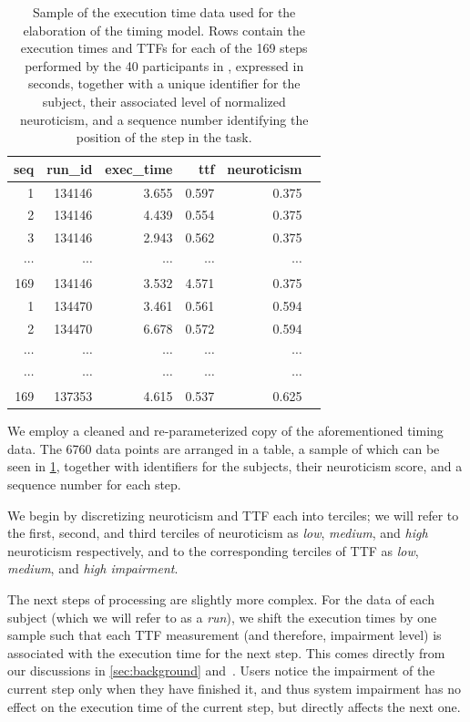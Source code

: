 \begin{table}
\centering
\caption[A]{%
    Sample of the execution time data  used for the elaboration of the timing model.
    Rows contain the execution times and \acp{TTF} for each of the \num{169} steps performed by the \num{40} participants in \textcite{olguinmunoz:impact2021}, expressed in seconds, together with a unique identifier for the subject, their associated level of normalized neuroticism, and a sequence number identifying the position of the step in the task.
}\label{tab:data:exectime}
\begin{tabular}{rrrrrr}
    \toprule
    {seq} & {run\_id} & {exec\_time} & {ttf} & {neuroticism}\\
    \midrule
    1 & 134146 & 3.655 & 0.597 & 0.375\\
    2 & 134146 & 4.439 & 0.554 & 0.375\\
    3 & 134146 & 2.943 & 0.562 & 0.375\\
    \( \cdots \) & \( \cdots \) & \( \cdots \) & \( \cdots \) & \( \cdots \) \\
    169 & 134146 & 3.532 & 4.571 & 0.375\\
    1 & 134470 & 3.461 & 0.561 & 0.594\\
    2 & 134470 & 6.678 & 0.572 & 0.594\\
    \( \cdots \) & \( \cdots \) & \( \cdots \) & \( \cdots \) & \( \cdots \) \\
    \( \cdots \) & \( \cdots \) & \( \cdots \) & \( \cdots \) & \( \cdots \) \\
    169 & 137353 & 4.615 & 0.537 & 0.625\\
    \bottomrule
    \end{tabular}
\end{table}

We employ a cleaned and re-parameterized copy of the aforementioned timing data.
The \num{6760} data points are arranged in a table, a sample of which can be seen in \cref{tab:data:exectime}, together with identifiers for the subjects, their neuroticism score, and a sequence number for each step.

We begin by discretizing neuroticism and \ac{TTF} each into terciles; we will refer to the first, second, and third terciles of neuroticism as \emph{low}, \emph{medium}, and \emph{high} neuroticism respectively, and to the corresponding terciles of \ac{TTF} as \emph{low}, \emph{medium}, and \emph{high impairment}.

The next steps of processing are slightly more complex.
For the data of each subject (which we will refer to as a \emph{run}), we shift the execution times by one sample such that each \ac{TTF} measurement (and therefore, impairment level) is associated with the execution time for the next step.
This comes directly from our discussions in \cref{sec:background} and~\cite{olguinmunoz:impact2021}.
Users notice the impairment of the current step only when they have finished it, and thus system impairment has no effect on the execution time of the current step, but directly affects the next one.

